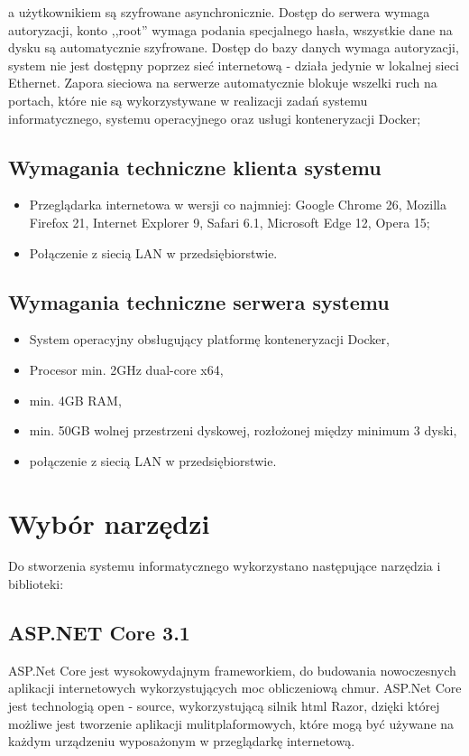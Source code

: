 \documentclass[12pt,a4paper]{article}
\begin{document}
\begin{itemize}
					a użytkownikiem są szyfrowane asynchronicznie. Dostęp do serwera wymaga autoryzacji, konto ,,root'' wymaga podania specjalnego hasła, wszystkie dane na dysku
					są automatycznie szyfrowane. Dostęp do bazy danych wymaga autoryzacji, system nie jest dostępny poprzez sieć internetową - działa jedynie w lokalnej sieci Ethernet.
					Zapora sieciowa na serwerze automatycznie blokuje wszelki ruch na portach, które nie są wykorzystywane w realizacji zadań systemu informatycznego, systemu operacyjnego
					oraz usługi konteneryzacji Docker;
			\end{itemize}
		\subsection{Wymagania techniczne klienta systemu}
			\begin{itemize}
				\item Przeglądarka internetowa w wersji co najmniej: Google Chrome 26, Mozilla Firefox 21, Internet Explorer 9, Safari 6.1, Microsoft Edge 12, Opera 15;
				\item Połączenie z siecią LAN w przedsiębiorstwie.
			\end{itemize}
		\subsection{Wymagania techniczne serwera systemu}
			\begin{itemize}
				\item System operacyjny obsługujący platformę konteneryzacji Docker,
				\item Procesor min. 2GHz dual-core x64,  				
				\item min. 4GB RAM,
				\item min. 50GB wolnej przestrzeni dyskowej, rozłożonej między minimum 3 dyski,
				\item połączenie z siecią LAN w przedsiębiorstwie.
			\end{itemize}				 	
	\newpage
	
	\section{Wybór narzędzi}
		\indent Do stworzenia systemu informatycznego wykorzystano następujące narzędzia i biblioteki:
		\subsection{ASP.NET Core 3.1}
			\indent ASP.Net Core jest wysokowydajnym frameworkiem, do budowania nowoczesnych aplikacji internetowych wykorzystujących moc obliczeniową chmur. ASP.Net Core jest technologią
			open - source, wykorzystującą silnik html Razor, dzięki której możliwe jest tworzenie aplikacji mulitplaformowych, które mogą być używane na każdym urządzeniu wyposażonym
			w przeglądarkę internetową.
\end{document}
